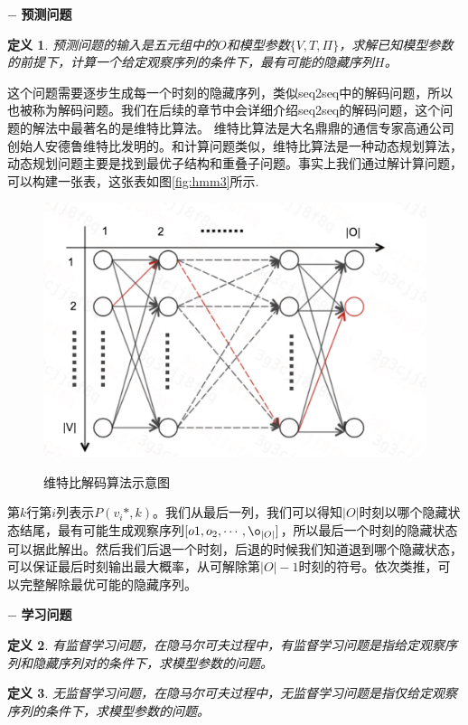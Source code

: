 \documentclass[twoside,a4paper,12pt]{book}%
\newtheorem{definition}{定义}
\begin{document}
$-$  \textbf{预测问题}
\begin{definition}
预测问题的输入是五元组中的$O$和模型参数$\{V,T,\Pi\}$，求解已知模型参数的前提下，计算一个给定观察序列的条件下，最有可能的隐藏序列$H$。
\end{definition}
这个问题需要逐步生成每一个时刻的隐藏序列，类似seq2seq中的解码问题，所以也被称为解码问题。我们在后续的章节中会详细介绍seq2seq的解码问题，这个问题的解法中最著名的是维特比算法。
维特比算法是大名鼎鼎的通信专家高通公司创始人安德鲁维特比发明的。和计算问题类似，维特比算法是一种动态规划算法，动态规划问题主要是找到最优子结构和重叠子问题。事实上我们通过解计算问题，可以构建一张表，这张表如图\ref{fig:hmm3}所示.
\begin{figure}[htbp]
\begin{center}
\includegraphics[width=5.5in]{figures/hmm3.png}
\caption{维特比解码算法示意图} \label{fig:hmm3}
\label{default}
\end{center}
\end{figure}
第$k$行第$i$列表示$P(v_i*,k)$。我们从最后一列，我们可以得知$|O|$时刻以哪个隐藏状态结尾，最有可能生成观察序列$[o1,o_2,\cdots,\o_{|O|}]$，所以最后一个时刻的隐藏状态可以据此解出。然后我们后退一个时刻，后退的时候我们知道退到哪个隐藏状态，可以保证最后时刻输出最大概率，从可解除第$|O|-1$时刻的符号。依次类推，可以完整解除最优可能的隐藏序列。


$-$ \textbf{学习问题}
\begin{definition}
有监督学习问题，在隐马尔可夫过程中，有监督学习问题是指给定观察序列和隐藏序列对的条件下，求模型参数的问题。
\end{definition}
\begin{definition}
无监督学习问题，在隐马尔可夫过程中，无监督学习问题是指仅给定观察序列的条件下，求模型参数的问题。
\end{definition}
\end{document}
